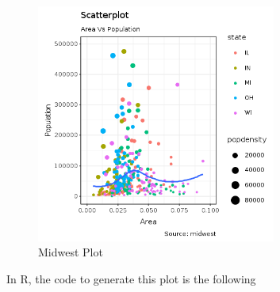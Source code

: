 \documentclass[11pt,]{article}
\begin{document}
\begin{figure}
\centering
\includegraphics[width=0.70000\textwidth]{midwest.png}
\caption{Midwest Plot}
\end{figure}

In R, the code to generate this plot is the following
\end{document}
